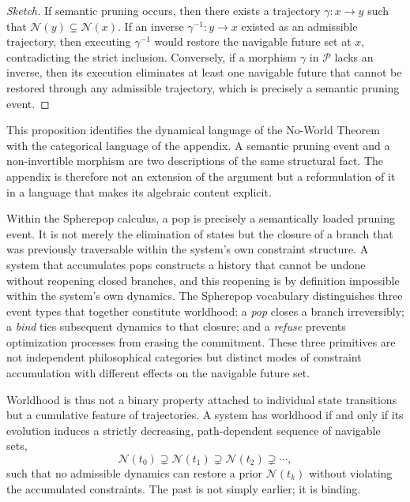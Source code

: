 \documentclass[11pt]{article}
\theoremstyle{definition}
\theoremstyle{remark}
\begin{document}
\begin{proof}[Sketch]
If semantic pruning occurs, then there exists a trajectory $\gamma: x \to y$ such that
$\mathcal{N}(y) \subsetneq \mathcal{N}(x)$. If an inverse $\gamma^{-1}: y \to x$ existed
as an admissible trajectory, then executing $\gamma^{-1}$ would restore the navigable
future set at $x$, contradicting the strict inclusion. Conversely, if a morphism $\gamma$
in $\mathcal{P}$ lacks an inverse, then its execution eliminates at least one navigable
future that cannot be restored through any admissible trajectory, which is precisely a
semantic pruning event.
\end{proof}

This proposition identifies the dynamical language of the No-World Theorem with the
categorical language of the appendix. A semantic pruning event and a non-invertible
morphism are two descriptions of the same structural fact. The appendix is therefore
not an extension of the argument but a reformulation of it in a language that makes its
algebraic content explicit.

Within the Spherepop calculus, a pop is precisely a semantically loaded pruning event. It
is not merely the elimination of states but the closure of a branch that was previously
traversable within the system's own constraint structure. A system that accumulates pops
constructs a history that cannot be undone without reopening closed branches, and this
reopening is by definition impossible within the system's own dynamics. The Spherepop
vocabulary distinguishes three event types that together constitute worldhood: a \emph{pop}
closes a branch irreversibly; a \emph{bind} ties subsequent dynamics to that closure; and
a \emph{refuse} prevents optimization processes from erasing the commitment. These three
primitives are not independent philosophical categories but distinct modes of constraint
accumulation with different effects on the navigable future set.

Worldhood is thus not a binary property attached to individual state transitions but a
cumulative feature of trajectories. A system has worldhood if and only if its evolution
induces a strictly decreasing, path-dependent sequence of navigable sets,
\[
\mathcal{N}(t_0) \supsetneq \mathcal{N}(t_1) \supsetneq \mathcal{N}(t_2) \supsetneq
\cdots,
\]
such that no admissible dynamics can restore a prior $\mathcal{N}(t_k)$ without violating
the accumulated constraints. The past is not simply earlier; it is binding.

\end{document}
